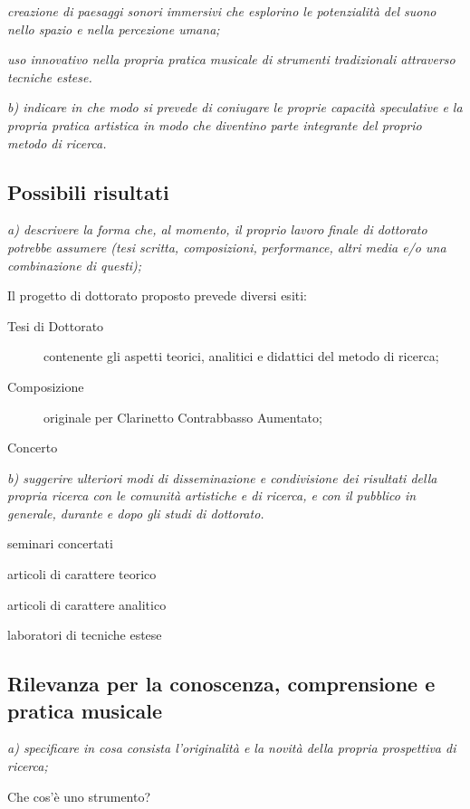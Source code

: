 \documentclass{gs-adonis}
\begin{document}
\emph{creazione di paesaggi sonori immersivi che esplorino le potenzialità del suono nello spazio e nella percezione umana;}

\emph{uso innovativo nella propria pratica musicale di strumenti tradizionali attraverso tecniche estese.}

\emph{b) indicare in che modo si prevede di coniugare le proprie capacità speculative e la propria pratica artistica in modo che diventino parte integrante del proprio metodo di ricerca.}

\subsection{Possibili risultati}%

\emph{a) descrivere la forma che, al momento, il proprio lavoro finale di dottorato potrebbe assumere (tesi scritta, composizioni, performance, altri media e/o una combinazione di questi);}

Il progetto di dottorato proposto prevede diversi esiti:

\begin{description}
  \item[Tesi di Dottorato] contenente gli aspetti teorici, analitici e didattici del metodo di ricerca;
  \item[Composizione] originale per Clarinetto Contrabbasso Aumentato;
  \item[Concerto]
\end{description}

\emph{b) suggerire ulteriori modi di disseminazione e condivisione dei risultati della propria ricerca con le comunità artistiche e di ricerca, e con il pubblico in generale, durante e dopo gli studi di dottorato.}

seminari concertati

articoli di carattere teorico

articoli di carattere analitico

laboratori di tecniche estese

\subsection{Rilevanza per la conoscenza, comprensione e pratica musicale}

\emph{a) specificare in cosa consista l’originalità e la novità della propria prospettiva di ricerca;}

Che cos'è uno strumento?
\end{document}
